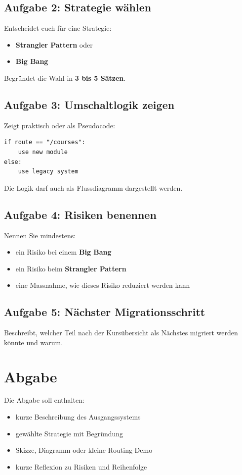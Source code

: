 \documentclass[a4paper,12pt]{article}
\begin{document}
\subsection*{Aufgabe 2: Strategie wählen}
Entscheidet euch für eine Strategie:
\begin{itemize}
\item \textbf{Strangler Pattern} oder
\item \textbf{Big Bang}
\end{itemize}

Begründet die Wahl in \textbf{3 bis 5 Sätzen}.

\subsection*{Aufgabe 3: Umschaltlogik zeigen}
Zeigt praktisch oder als Pseudocode:

\begin{lstlisting}
if route == "/courses":
    use new module
else:
    use legacy system
\end{lstlisting}

Die Logik darf auch als Flussdiagramm dargestellt werden.

\subsection*{Aufgabe 4: Risiken benennen}
Nennen Sie mindestens:
\begin{itemize}
\item ein Risiko bei einem \textbf{Big Bang}
\item ein Risiko beim \textbf{Strangler Pattern}
\item eine Massnahme, wie dieses Risiko reduziert werden kann
\end{itemize}

\subsection*{Aufgabe 5: Nächster Migrationsschritt}
Beschreibt, welcher Teil nach der Kursübersicht als Nächstes migriert werden könnte
und warum.

\section*{Abgabe}

Die Abgabe soll enthalten:

\begin{itemize}
\item kurze Beschreibung des Ausgangssystems
\item gewählte Strategie mit Begründung
\item Skizze, Diagramm oder kleine Routing-Demo
\item kurze Reflexion zu Risiken und Reihenfolge
\end{itemize}
\end{document}
